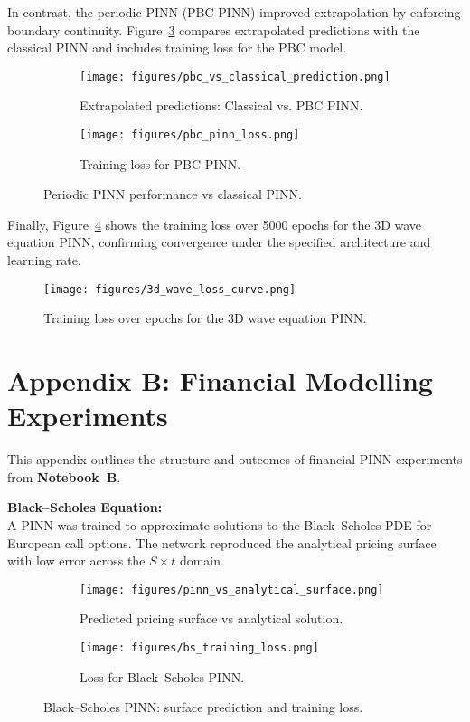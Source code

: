 \documentclass[12pt,a4paper]{article}
\begin{document}
In contrast, the periodic PINN (PBC PINN) improved extrapolation by enforcing boundary continuity. Figure~\ref{fig:pbc-combined} compares extrapolated predictions with the classical PINN and includes training loss for the PBC model.

\begin{figure}[h!]
  \centering
  \begin{subfigure}[t]{0.48\textwidth}
    \texttt{[image: figures/pbc\_vs\_classical\_prediction.png]}
    \caption{Extrapolated predictions: Classical vs. PBC PINN.}
    \label{fig:pbc-vs-classical}
  \end{subfigure}
  \hfill
  \begin{subfigure}[t]{0.48\textwidth}
    \texttt{[image: figures/pbc\_pinn\_loss.png]}
    \caption{Training loss for PBC PINN.}
    \label{fig:pbc-loss}
  \end{subfigure}
  \caption{Periodic PINN performance vs classical PINN.}
  \label{fig:pbc-combined}
\end{figure}

Finally, Figure~\ref{fig:3d-loss} shows the training loss over 5000 epochs for the 3D wave equation PINN, confirming convergence under the specified architecture and learning rate.

\begin{figure}[h!]
  \centering
  \texttt{[image: figures/3d\_wave\_loss\_curve.png]}
  \caption{Training loss over epochs for the 3D wave equation PINN.}
  \label{fig:3d-loss}
\end{figure}

\clearpage
{}
\section*{Appendix B: Financial Modelling Experiments}

This appendix outlines the structure and outcomes of financial PINN experiments from \textbf{Notebook~B}.

\textbf{Black--Scholes Equation:} \\
A PINN was trained to approximate solutions to the Black--Scholes PDE for European call options. The network reproduced the analytical pricing surface with low error across the \( S \times t \) domain.

\begin{figure}[h!]
  \centering
  \begin{subfigure}[t]{0.48\textwidth}
    \texttt{[image: figures/pinn\_vs\_analytical\_surface.png]}
    \caption{Predicted pricing surface vs analytical solution.}
    \label{fig:bs-surface}
  \end{subfigure}
  \hfill
  \begin{subfigure}[t]{0.48\textwidth}
    \texttt{[image: figures/bs\_training\_loss.png]}
    \caption{Loss for Black--Scholes PINN.}
    \label{fig:bs-loss}
  \end{subfigure}
  \caption{Black--Scholes PINN: surface prediction and training loss.}
\end{figure}
\end{document}
